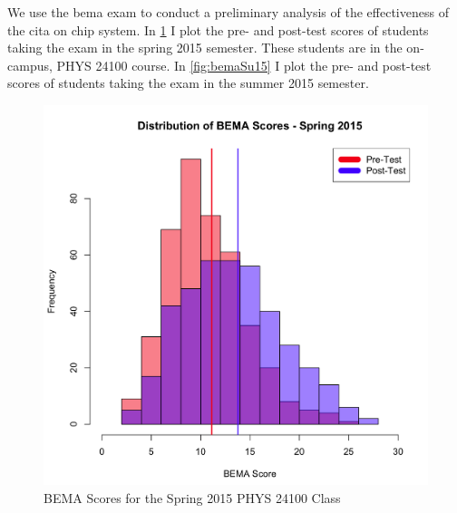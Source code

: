 We use the \gls{bema} exam to conduct a preliminary analysis of the effectiveness of the \gls{cita} on \gls{chip} system. In \ref{fig:bemaSp15} I plot the pre- and post-test scores of students taking the exam in the spring 2015 semester. These students are in the on-campus, PHYS 24100 course. In \ref{fig:bemaSu15} I plot the pre- and post-test scores of students taking the exam in the summer 2015 semester.

\begin{figure}[!htb]
	\centering
	\includegraphics[width=6in]{img/chapter4/bema_spring_2015}
	\caption[BEMA Scores for the Spring 2015 PHYS 24100 Class]{BEMA Scores for the Spring 2015 PHYS 24100 Class}
  \label{fig:bemaSp15}
\end{figure}

\pagebreak

